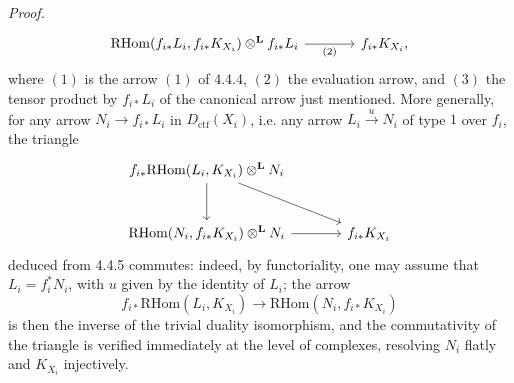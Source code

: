 \documentclass[11pt]{article}
\newenvironment{prooftext}[1][Proof]{\par\noindent\emph{#1.}\ }{\par\medskip}
\providecommand{\RHom}{\mathrm{RHom}}
\providecommand{\Dctf}{D_{\mathrm{ctf}}}
\begin{document}
\begin{prooftext}[Proof]
\begin{equation}
\begin{tikzcd}[column sep=large,row sep=large]
\RHom(f_{i*}L_i,f_{i*}K_{X_i})\otimes^{\mathbf L} f_{i*}L_i
 \arrow[r,"(2)"'] &
f_{i*}K_{X_i},
\end{tikzcd}
\end{equation}
where $(1)$ is the arrow $(1)$ of 4.4.4, $(2)$ the evaluation arrow, and $(3)$ the tensor product by $f_{i*}L_i$ of the canonical arrow just mentioned. More generally, for any arrow $N_i\longrightarrow f_{i*}L_i$ in $\Dctf(X_i)$, i.e. any arrow $L_i\xrightarrow{u}N_i$ of type $1$ over $f_i$, the triangle
\[
\begin{tikzcd}[column sep=large,row sep=large]
f_{i*}\RHom(L_i,K_{X_i})\otimes^{\mathbf L}N_i
 \arrow[dr] \arrow[d] & \\
\RHom(N_i,f_{i*}K_{X_i})\otimes^{\mathbf L}N_i \arrow[r] &
f_{i*}K_{X_i}
\end{tikzcd}
\]
deduced from 4.4.5 commutes: indeed, by functoriality, one may assume that $L_i=f_i^*N_i$, with $u$ given by the identity of $L_i$; the arrow
\[
f_{i*}\RHom(L_i,K_{X_i})\longrightarrow\RHom(N_i,f_{i*}K_{X_i})
\]
is then the inverse of the trivial duality isomorphism, and the commutativity of the triangle is verified immediately at the level of complexes, resolving $N_i$ flatly and $K_{X_i}$ injectively.


\end{prooftext}
\end{document}
